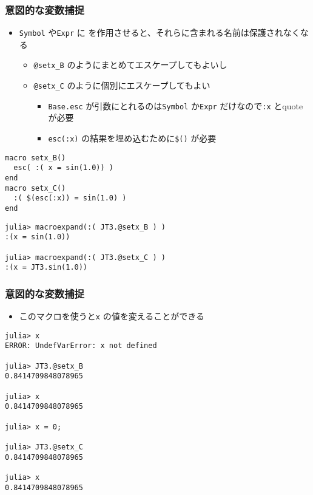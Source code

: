 \begin{frame}[containsverbatim]
\frametitle{意図的な変数捕捉}
\begin{itemize}
  \item \verb|Symbol| や\verb|Expr| に を作用させると、それらに含まれる名前は保護されなくなる
    \begin{itemize}
      \item \verb|@setx_B| のようにまとめてエスケープしてもよいし
      \item \verb|@setx_C| のように個別にエスケープしてもよい
        \begin{itemize}
          \item \verb|Base.esc| が引数にとれるのは\verb|Symbol| か\verb|Expr| だけなので\verb|:x| とquote が必要
            \item \verb|esc(:x)| の結果を埋め込むために\verb|$()| が必要
        \end{itemize}
    \end{itemize}
\end{itemize}
\begin{lstlisting}
macro setx_B()
  esc( :( x = sin(1.0)) )
end
macro setx_C()
  :( $(esc(:x)) = sin(1.0) )
end

\end{lstlisting}
\begin{lstlisting}
julia> macroexpand(:( JT3.@setx_B ) )
:(x = sin(1.0))

julia> macroexpand(:( JT3.@setx_C ) )
:(x = JT3.sin(1.0))
\end{lstlisting}
\end{frame}

\begin{frame}[containsverbatim]
\frametitle{意図的な変数捕捉}
\begin{itemize}
  \item このマクロを使うと\verb|x| の値を変えることができる
\end{itemize}
\begin{lstlisting}
julia> x
ERROR: UndefVarError: x not defined

julia> JT3.@setx_B
0.8414709848078965

julia> x
0.8414709848078965

julia> x = 0;

julia> JT3.@setx_C
0.8414709848078965

julia> x
0.8414709848078965
\end{lstlisting}

\end{frame}

